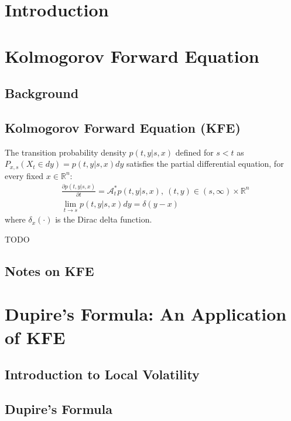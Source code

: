 \documentclass[opre]{informs3}
\begin{document}
    \maketitle
    
    \section{Introduction}

    \section{Kolmogorov Forward Equation}
    \subsection{Background}
    


    \subsection{Kolmogorov Forward Equation (KFE)}
    \begin{theorem}\label{thm:KFE} The transition probability density $p(t, y | s, x)$ defined for $s < t$ as $P_{x,s}(X_t \in dy) = p(t, y | s, x)dy$ satisfies the partial differential equation, for every fixed $x \in \mathbb{R}^n$:
    \begin{align}
        &\frac{\partial p(t, y | s, x)}{\partial t} = \mathcal{A}_t^*p(t, y | s, x),~(t, y) \in (s, \infty)\times\mathbb{R}^n \label{equ:KFE}\\
        &\lim_{t\rightarrow s} p(t, y | s, x) dy = \delta(y - x) \label{equ:init_condition}
    \end{align}    
    where $\delta_x(\cdot)$ is the Dirac delta function.
    
    \end{theorem}
        TODO
    \endproof

    \subsection{Notes on KFE}
    
    \section{Dupire’s Formula: An Application of KFE}
    \subsection{Introduction to Local Volatility}
    \subsection{Dupire's Formula}
    
\end{document}
